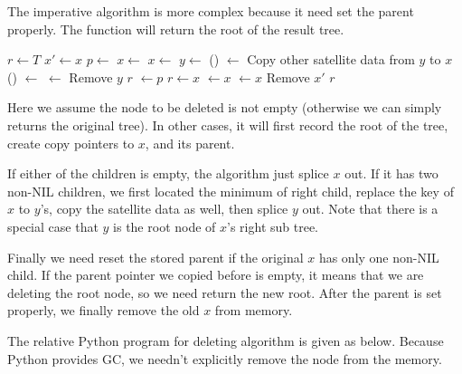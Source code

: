 \documentclass{article}
\begin{document}
The imperative algorithm is more complex because it need set the
parent properly. The function will return the root of the result tree.

\begin{algorithmic}[1]
  \State $r \gets T$
  \State $x' \gets x$ 
  \State $p \gets $ 
    \State $x \gets $ 
    \State $x \gets $ 
  \Else
    \State  $y \gets $ ()
    \State {} $\gets$ 
    \State Copy other satellite data from $y$ to $x$
      \State {}() $\gets$ 
    \Else
      \State {} $\gets$ 
    \EndIf
    \State Remove $y$
    \State \Return $r$
  \EndIf
    \State {} $\gets p$
  \EndIf
    \State $r \gets x$
  \Else
      \State {} $\gets x$
    \Else
      \State {} $\gets x$
    \EndIf
  \EndIf
  \State Remove $x'$
  \State \Return $r$
\EndFunction
\end{algorithmic}

Here we assume the node to be deleted is not empty (otherwise we can
simply returns the original tree). In other cases, it will first record
the root of the tree, create copy pointers to $x$, and its parent.

If either of the children is empty, the algorithm just splice $x$ out.
If it has two non-NIL children, we first located the minimum of right
child, replace the key of $x$ to $y$'s, copy the satellite data as
well, then splice $y$ out. Note that there is a special case that $y$
is the root node of $x$'s right sub tree.

Finally we need reset the stored parent if the original $x$ has only
one non-NIL child.
If the parent pointer we copied before is empty, it
means that we are deleting the root node, so we need return the new root. After
the parent is set properly, we finally remove the old $x$ from memory.

The relative Python program for deleting algorithm is given as below.
Because Python provides GC, we needn't explicitly remove the node
from the memory.
\end{document}
